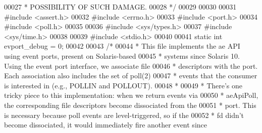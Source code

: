 \begin{DoxyCode}
00027 \textcolor{comment}{ * POSSIBILITY OF SUCH DAMAGE.}
00028 \textcolor{comment}{ */}
00029 
00030 
00031 \textcolor{preprocessor}{#}\textcolor{preprocessor}{include} \textcolor{preprocessor}{<}\textcolor{preprocessor}{assert}\textcolor{preprocessor}{.}\textcolor{preprocessor}{h}\textcolor{preprocessor}{>}
00032 \textcolor{preprocessor}{#}\textcolor{preprocessor}{include} \textcolor{preprocessor}{<}\textcolor{preprocessor}{errno}\textcolor{preprocessor}{.}\textcolor{preprocessor}{h}\textcolor{preprocessor}{>}
00033 \textcolor{preprocessor}{#}\textcolor{preprocessor}{include} \textcolor{preprocessor}{<}\textcolor{preprocessor}{port}\textcolor{preprocessor}{.}\textcolor{preprocessor}{h}\textcolor{preprocessor}{>}
00034 \textcolor{preprocessor}{#}\textcolor{preprocessor}{include} \textcolor{preprocessor}{<}\textcolor{preprocessor}{poll}\textcolor{preprocessor}{.}\textcolor{preprocessor}{h}\textcolor{preprocessor}{>}
00035 
00036 \textcolor{preprocessor}{#}\textcolor{preprocessor}{include} \textcolor{preprocessor}{<}\textcolor{preprocessor}{sys}\textcolor{preprocessor}{/}\textcolor{preprocessor}{types}\textcolor{preprocessor}{.}\textcolor{preprocessor}{h}\textcolor{preprocessor}{>}
00037 \textcolor{preprocessor}{#}\textcolor{preprocessor}{include} \textcolor{preprocessor}{<}\textcolor{preprocessor}{sys}\textcolor{preprocessor}{/}\textcolor{preprocessor}{time}\textcolor{preprocessor}{.}\textcolor{preprocessor}{h}\textcolor{preprocessor}{>}
00038 
00039 \textcolor{preprocessor}{#}\textcolor{preprocessor}{include} \textcolor{preprocessor}{<}\textcolor{preprocessor}{stdio}\textcolor{preprocessor}{.}\textcolor{preprocessor}{h}\textcolor{preprocessor}{>}
00040 
00041 \textcolor{keyword}{static} \textcolor{keywordtype}{int} evport\_debug = 0;
00042 
00043 \textcolor{comment}{/*}
00044 \textcolor{comment}{ * This file implements the ae API using event ports, present on Solaris-based}
00045 \textcolor{comment}{ * systems since Solaris 10.  Using the event port interface, we associate file}
00046 \textcolor{comment}{ * descriptors with the port.  Each association also includes the set of poll(2)}
00047 \textcolor{comment}{ * events that the consumer is interested in (e.g., POLLIN and POLLOUT).}
00048 \textcolor{comment}{ *}
00049 \textcolor{comment}{ * There's one tricky piece to this implementation: when we return events via}
00050 \textcolor{comment}{ * aeApiPoll, the corresponding file descriptors become dissociated from the}
00051 \textcolor{comment}{ * port.  This is necessary because poll events are level-triggered, so if the}
00052 \textcolor{comment}{ * fd didn't become dissociated, it would immediately fire another event since}

\end{DoxyCode}
